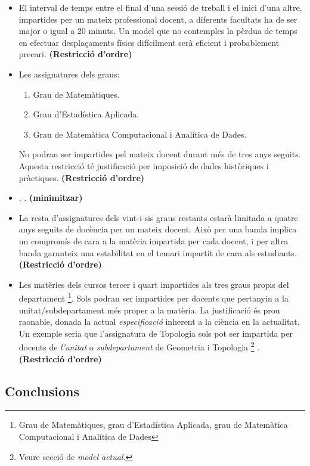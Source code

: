\documentclass[10pt,twocolumn]{article}
\begin{document}
\begin{enumerate}
\begin{itemize}
    	\item El interval de temps entre el final d'una sessió de treball i el inici d'una altre, impartides per un mateix professional docent, a diferents facultats ha de ser major o igual a 20 minuts. {\color{gray} Un model que no contemples la pèrdua de temps en efectuar desplaçaments físics difícilment serà eficient i probablement precari.} \textbf{(Restricció d'ordre)} 
    	\item Les assignatures dels graus:
    	\begin{enumerate} 
    		\item Grau de Matemàtiques.
    		\item Grau d'Estadística Aplicada.
    		\item Grau de Matemàtica Computacional i Analítica de Dades.
    	\end{enumerate}
      No podran ser impartides pel mateix docent durant més de tres anys seguits.
      {\color{gray} Aquesta restricció té justificació per imposició de dades històriques i pràctiques.} \textbf{(Restricció d'ordre)} 
    	\item  . {\color{gray} .} \textbf{(minimitzar)} 
    	\item La resta d'assignatures dels vint-i-sis graus restants estarà limitada a quatre anys seguits de docència per un mateix docent. {\color{gray} Això per una banda implica un compromís de cara a la matèria impartida per cada docent, i per altra banda garanteix una estabilitat en el temari impartit de cara als estudiants.} \textbf{(Restricció d'ordre)} 
    	\item  Les matèries  dels cursos tercer i quart impartides als tres graus propis del departament \footnote{Grau de Matemàtiques, grau d'Estadística Aplicada, grau de Matemàtica Computacional i Analítica de Dades}. Sols podran ser impartides per docents que pertanyin a la unitat/subdepartament més proper a la matèria.   {\color{gray} La justificació és prou raonable, donada la actual \textit{especificació} inherent a la ciència en la actualitat. Un exemple seria que l'assignatura de Topologia sols pot ser impartida per docents de \textit{l'unitat} o \textit{subdepartament} de Geometria i Topologia \footnote{Veure secció de  \textit{model actual}.} .} \textbf{(Restricció d'ordre)} 
    \end{itemize}																								
\begin{tcolorbox}[colframe=white,colback=redviolet!20,sharp corners=all,size=minimal,halign=center,valign=center]
	\section{Conclusions}
\end{tcolorbox}
\end{enumerate}
\end{document}

